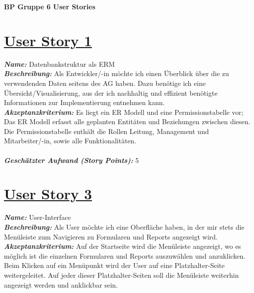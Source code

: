 \documentclass[12pt]{article}%
\begin{document}

\begin{center}
\textbf{\Large BP Gruppe 6 User Stories} \\
\end{center}

\section*{\large \underline{User Story 1}}

\textit{\textbf{Name:}} Datenbankstruktur als ERM
\\

\textbf{\textit{Beschreibung:}} Als Entwickler/-in möchte ich einen Überblick über die zu verwendenden Daten seitens des AG haben. Dazu benötige ich eine Übersicht/Visualisierung, aus der ich nachhaltig und effizient benötigte Informationen zur Implementierung entnehmen kann.
\\

\textbf{\textit{Akzeptanzkriterium:}} Es liegt ein ER Modell und eine Permissionstabelle vor; Das ER Modell erfasst alle geplanten Entitäten und Beziehungen zwischen diesen. Die Permissionstabelle enthält die Rollen Leitung, Management und Mitarbeiter/-in, sowie alle Funktionalitäten. \\


\\
\textbf{\textit{Geschätzter Aufwand (Story Points):}} 5


\section*{\large \underline{User Story 3}}
\textit{\textbf{Name:}} User-Interface
\\

\textbf{\textit{Beschreibung:}} Als User möchte ich eine Oberfläche haben, in der mir stets die Menüleiste zum Navigieren zu Formularen und Reports angezeigt wird. 
\\

\textbf{\textit{Akzeptanzkriterium:}} Auf der Startseite wird die Menüleiste angezeigt, wo es möglich ist die einzelnen Formularen und Reports auszuwählen und anzuklicken. Beim Klicken auf ein Menüpunkt wird der User auf eine Platzhalter-Seite weitergeleitet. Auf jeder dieser Platzhalter-Seiten soll die Menüleiste weiterhin angezeigt werden und anklickbar sein.
\end{document}
